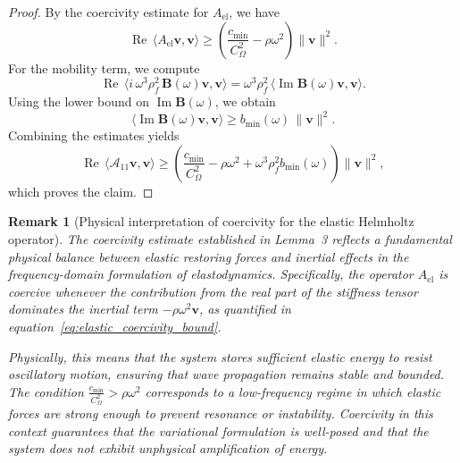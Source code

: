 \documentclass[pdflatex,sn-mathphys-num]{sn-jnl}
\theoremstyle{thmstyleone}%
\theoremstyle{thmstyletwo}%
\newtheorem{remark}{Remark}%
\theoremstyle{thmstylethree}%
\def \calA {\mathcal{A}}
\theoremstyle{definition}
\begin{document}
	\begin{proof}
		By the coercivity estimate for $A_{\mathrm{el}}$, we have
		\begin{equation*}
			\operatorname{Re}\,\langle A_{\mathrm{el}}\mathbf{v}, \mathbf{v} \rangle
			\ge \left( \frac{c_{\min}}{C_{\Omega}^2} - \rho \omega^2 \right)\|\mathbf{v}\|^2.
		\end{equation*}
		For the mobility term, we compute
		\begin{equation*}
			\operatorname{Re}\,\langle i\,\omega^3 \rho_f^2\,\mathbf{B}(\omega)\mathbf{v}, \mathbf{v} \rangle
			= \omega^3 \rho_f^2\,\langle \operatorname{Im}\mathbf{B}(\omega)\mathbf{v}, \mathbf{v} \rangle.
		\end{equation*}
		Using the lower bound on $\operatorname{Im}\mathbf{B}(\omega)$, we obtain
		\begin{equation*}
			\langle \operatorname{Im}\mathbf{B}(\omega)\mathbf{v}, \mathbf{v} \rangle
			\ge b_{\min}(\omega)\,\|\mathbf{v}\|^2.
		\end{equation*}
		Combining the estimates yields
		\begin{equation*}
			\operatorname{Re}\,\langle \calA_{11}\mathbf{v}, \mathbf{v} \rangle
			\ge \left( \frac{c_{\min}}{C_{\Omega}^2} - \rho \omega^2 + \omega^3 \rho_f^2 b_{\min}(\omega) \right)\|\mathbf{v}\|^2,
		\end{equation*}
		which proves the claim.
	\end{proof}
	
	\setcounter{theorem}{4}
	
	
	\begin{remark}[Physical interpretation of coercivity for the elastic Helmholtz operator]
		The coercivity estimate established in Lemma~3 reflects a fundamental physical balance between elastic restoring forces and inertial effects in the frequency-domain formulation of elastodynamics. Specifically, the operator \( A_{\mathrm{el}} \) is coercive whenever the contribution from the real part of the stiffness tensor dominates the inertial term \( -\rho \omega^2 \mathbf{v} \), as quantified in equation~\eqref{eq:elastic_coercivity_bound}.
		
		Physically, this means that the system stores sufficient elastic energy to resist oscillatory motion, ensuring that wave propagation remains stable and bounded. The condition \( \frac{c_{\min}}{C_{\Omega}^2} > \rho \omega^2 \) corresponds to a low-frequency regime in which elastic forces are strong enough to prevent resonance or instability. Coercivity in this context guarantees that the variational formulation is well-posed and that the system does not exhibit unphysical amplification of energy.
	\end{remark}
	
\end{document}
